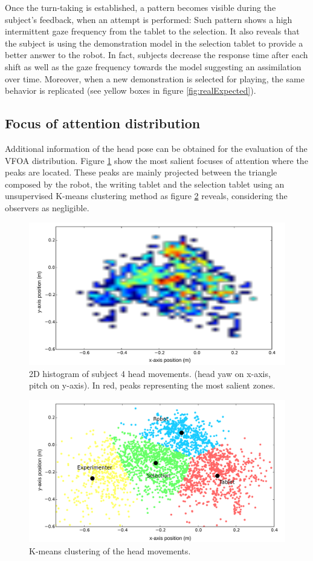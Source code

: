 \documentclass{sig-alternate}
\begin{document}
Once the turn-taking is established, a pattern becomes visible during the subject's feedback, when an attempt is performed: Such pattern shows a high intermittent gaze frequency from the tablet to the selection. It also reveals that the subject is using the demonstration model in the selection tablet to provide a better answer to the robot. In fact, subjects decrease the response time after each shift as well as the gaze frequency towards the model suggesting an assimilation over time. Moreover, when a new demonstration is selected for playing, the same behavior is replicated (see yellow boxes in figure \ref{fig:realExpected}).
\\
\subsection{Focus of attention distribution}
Additional information of the head pose can be obtained for the evaluation of the VFOA distribution. Figure \ref{heatmap} show the most salient focuses of attention where the peaks are located. These peaks are mainly projected between the triangle composed by the robot, the writing tablet and the selection tablet using an unsupervised K-means clustering method as figure \ref{kmeans} reveals, considering the observers as negligible.

\begin{figure}[h!]
    \centering
    \includegraphics[width=0.9\columnwidth]{heatmap}
    \caption{\small 2D histogram of subject 4 head movements. (head yaw on x-axis, pitch on y-axis). In red, peaks representing the most salient zones.}
    \label{heatmap}
\end{figure}

\begin{figure}[h!]
    \centering
    \includegraphics[width=0.9\columnwidth]{kmeans}
    \caption{\small K-means clustering of the head movements.}
    \label{kmeans}
\end{figure}
\end{document}
